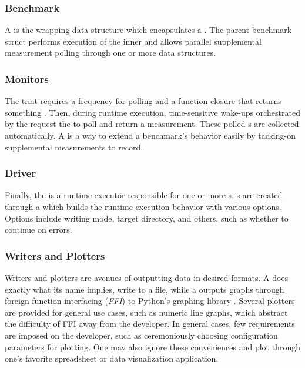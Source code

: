 \subsubsection{Benchmark}
A  is the wrapping data structure which encapsulates a . The parent benchmark struct performs execution of the inner  and allows parallel supplemental measurement polling through one or more  data structures.

\subsubsection{Monitors}
The  trait requires a frequency for polling and a function closure that returns something . Then, during runtime execution, time-sensitive wake-ups orchestrated by the  request the  to poll and return a measurement. These polled s are collected automatically. A  is a way to extend a benchmark's behavior easily by tacking-on supplemental measurements to record.

\subsubsection{Driver}
Finally, the  is a runtime executor responsible for one or more s. s are created through a  which builds the runtime execution behavior with various options. Options include writing mode, target directory, and others, such as whether to continue on errors.

\subsubsection{Writers and Plotters}
Writers and plotters are avenues of outputting data in desired formats. A  does exactly what its name implies, write  to a file, while a  outputs graphs through foreign function interfacing (\textit{FFI}) to Python's graphing library  . Several plotters are provided for general use cases, such as numeric line graphs, which abstract the difficulty of FFI away from the developer. In general cases, few requirements are imposed on the developer, such as ceremoniously choosing configuration parameters for plotting. One may also ignore these conveniences and plot through one's favorite spreadsheet or data visualization application.

